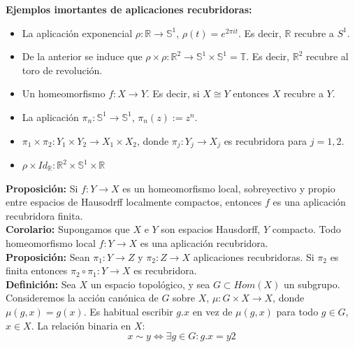 \documentclass{article}
\begin{document}
\textbf{Ejemplos imortantes de aplicaciones recubridoras:}
\begin{itemize}
\item La aplicación exponencial $\rho:\mathbb{R}\rightarrow \mathbb{S}^1$, $\rho(t)=e^{2\pi i t}$. Es decir, $\mathbb{R}$ recubre a $S^1$.

\item De la anterior se induce que $\rho\times \rho:\mathbb{R}^2\rightarrow \mathbb{S}^1\times \mathbb{S}^1=\mathbb{T}$. Es decir, $\mathbb{R}^2$ recubre al toro de revolución.

\item Un homeomorfismo $f:X\rightarrow Y$. Es decir, si $X\cong Y$ entonces $X$ recubre a $Y$.

\item La aplicación $\pi_n:\mathbb{S}^1\rightarrow \mathbb{S}^1$, $\pi_n(z):=z^n$.

\item $\pi_1\times \pi_2:Y_1\times Y_2\rightarrow X_1\times X_2$, donde $\pi_j:Y_j\rightarrow X_j$ es recubridora para $j=1,2$.

\item $\rho\times Id_{\mathbb{R}}:\mathbb{R}^2\times \mathbb{S}^1\times \mathbb{R}$
\end{itemize}

\textbf{Proposición:} Si $f:Y\rightarrow X$ es un homeomorfismo local, sobreyectivo y propio entre espacios de Hausodrff localmente compactos, entonces $f$ es una aplicación recubridora finita. \\

\textbf{Corolario:} Supongamos que $X$ e $Y$ son espacios Hausdorff, $Y$ compacto. Todo homeomorfismo local $f:Y\rightarrow X$ es una aplicación recubridora. \\

\textbf{Proposición:} Sean $\pi_1:Y\rightarrow Z$ y $\pi_2:Z\rightarrow X$ aplicaciones recubridoras. Si $\pi_2$ es finita entonces $\pi_2\circ \pi_1: Y\rightarrow X$ es recubridora. \\

\textbf{Definición:} Sea $X$ un espacio topológico, y sea $G\subset Hom(X)$ un subgrupo. Consideremos la acción canónica de $G$ sobre $X$, $\mu:G\times X\rightarrow X$, donde $\mu(g,x)=g(x)$. Es habitual escribir $g.x$ en vez de $\mu(g,x)$ para todo $g\in G$, $x\in X$. La relación binaria en $X$:
\begin{equation*}
x\sim y\Leftrightarrow \exists g\in G: g.x=y2
\end{equation*}
\end{document}
